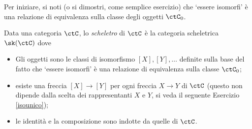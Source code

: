 Per iniziare, si noti (o si dimostri, come semplice esercizio) che `essere isomorfi' è una relazione di equivalenza sulla classe degli oggetti \(\ctC_0\).
\begin{definition}\label{def_scheletro}
 Data una categoria \(\ctC\), lo \emph{scheletro} di \(\ctC\) è la categoria scheletrica \(\sk(\ctC)\) dove
 \begin{itemize}
  \item Gli oggetti sono le classi di isomorfismo \([X],[Y],\dots\) definite sulla base del fatto che `essere isomorfi' è una relazione di equivalenza sulla classe \(\ctC_0\);
  \item esiste una freccia \([X]\to[Y]\) per ogni freccia \(X\to Y\) di \(\ctC\) (questo non dipende dalla scelta dei rappresentanti \(X\) e \(Y\), si veda il seguente Esercizio \ref{isounico});
  \item le identità e la composizione sono indotte da quelle di \(\ctC\).
 \end{itemize}
\end{definition}
